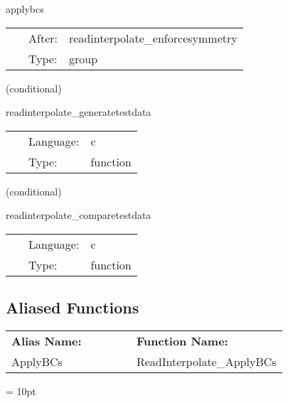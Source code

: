 \hspace{5mm} applybcs 

\hspace{5mm}{\it apply symmetry conditions to read in variables } 


\hspace{5mm}

 \begin{tabular*}{160mm}{cll} 
~ & After:  & readinterpolate\_enforcesymmetry \\ 
~ & Type:  & group \\ 
\end{tabular*} 


\vspace{5mm}

   (conditional) 

\hspace{5mm} readinterpolate\_generatetestdata 

\hspace{5mm}{\it generate polynomial test data } 


\hspace{5mm}

 \begin{tabular*}{160mm}{cll} 
~ & Language:  & c \\ 
~ & Type:  & function \\ 
\end{tabular*} 


\vspace{5mm}

   (conditional) 

\hspace{5mm} readinterpolate\_comparetestdata 

\hspace{5mm}{\it compare to polynomial test data } 


\hspace{5mm}

 \begin{tabular*}{160mm}{cll} 
~ & Language:  & c \\ 
~ & Type:  & function \\ 
\end{tabular*} 


\subsection*{Aliased Functions}

\hspace{5mm}

 \begin{tabular*}{160mm}{ll} 

{\bf Alias Name:} ~~~~~~~ & {\bf Function Name:} \\ 
ApplyBCs & ReadInterpolate\_ApplyBCs \\ 
\end{tabular*} 



\vspace{5mm}\parskip = 10pt 


